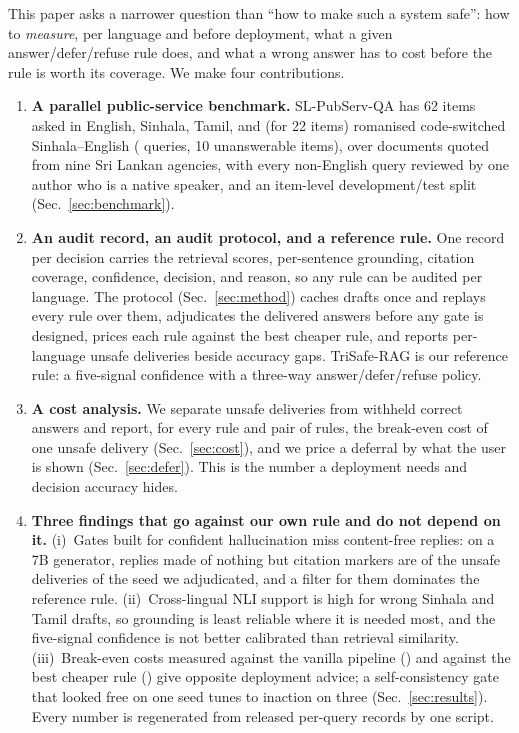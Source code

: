 This paper asks a narrower question than ``how to make such a system safe'': how to \emph{measure}, per language and before deployment, what a given answer/defer/refuse rule does, and what a wrong answer has to cost before the rule is worth its coverage. We make four contributions.
\begin{enumerate}
  \item \textbf{A parallel public-service benchmark.} SL-PubServ-QA has 62 items asked in English, Sinhala, Tamil, and (for 22 items) romanised code-switched Sinhala--English (\Lnq{} queries, 10 unanswerable items), over \Lndocs{} documents quoted from nine Sri Lankan agencies, with every non-English query reviewed by one author who is a native speaker, and an item-level development/test split (Sec.~\ref{sec:benchmark}).
  \item \textbf{An audit record, an audit protocol, and a reference rule.} One record per decision carries the retrieval scores, per-sentence grounding, citation coverage, confidence, decision, and reason, so any rule can be audited per language. The protocol (Sec.~\ref{sec:method}) caches drafts once and replays every rule over them, adjudicates the delivered answers before any gate is designed, prices each rule against the best cheaper rule, and reports per-language unsafe deliveries beside accuracy gaps. TriSafe-RAG is our reference rule: a five-signal confidence with a three-way answer/defer/refuse policy.
  \item \textbf{A cost analysis.} We separate unsafe deliveries from withheld correct answers and report, for every rule and pair of rules, the break-even cost of one unsafe delivery (Sec.~\ref{sec:cost}), and we price a deferral by what the user is shown (Sec.~\ref{sec:defer}). This is the number a deployment needs and decision accuracy hides.
  \item \textbf{Three findings that go against our own rule and do not depend on it.} (i)~Gates built for confident hallucination miss content-free replies: on a 7B generator, replies made of nothing but citation markers are \LAdjEmpty{} of the \LBoneUnsafeSeedZero{} unsafe deliveries of the seed we adjudicated, and a filter for them dominates the reference rule. (ii)~Cross-lingual NLI support is high for wrong Sinhala and Tamil drafts, so grounding is least reliable where it is needed most, and the five-signal confidence is not better calibrated than retrieval similarity. (iii)~Break-even costs measured against the vanilla pipeline (\LTemptyBreakEven) and against the best cheaper rule (\LTemptyBreakEvenEmpty) give opposite deployment advice; a self-consistency gate that looked free on one seed tunes to inaction on three (Sec.~\ref{sec:results}). Every number is regenerated from released per-query records by one script.
\end{enumerate}

